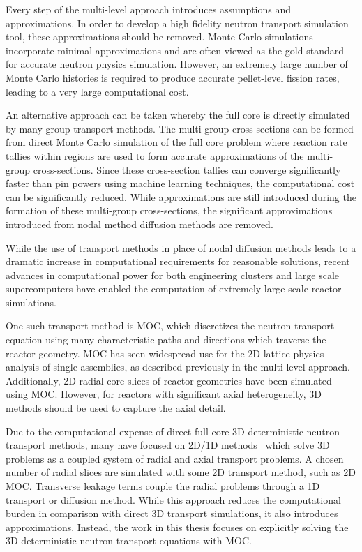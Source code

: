 Every step of the multi-level approach introduces assumptions and approximations. In order to develop a high fidelity neutron transport simulation tool, these approximations should be removed. Monte Carlo simulations incorporate minimal approximations and are often viewed as the gold standard for accurate neutron physics simulation. However, an extremely large number of Monte Carlo histories is required to produce accurate pellet-level fission rates, leading to a very large computational cost.

An alternative approach can be taken whereby the full core is directly simulated by many-group transport methods. The multi-group cross-sections can be formed from direct Monte Carlo simulation of the full core problem where reaction rate tallies within regions are used to form accurate approximations of the multi-group cross-sections. Since these cross-section tallies can converge significantly faster than pin powers using machine learning techniques, the computational cost can be significantly reduced. While approximations are still introduced during the formation of these multi-group cross-sections, the significant approximations introduced from nodal method diffusion methods are removed.

While the use of transport methods in place of nodal diffusion methods leads to a dramatic increase in computational requirements for reasonable solutions, recent advances in computational power for both engineering clusters and large scale supercomputers have enabled the computation of extremely large scale reactor simulations. 

One such transport method is \ac{MOC}, which discretizes the neutron transport equation using many characteristic paths and directions which traverse the reactor geometry. \ac{MOC} has seen widespread use for the 2D lattice physics analysis of single assemblies, as described previously in the multi-level approach. Additionally, 2D radial core slices of reactor geometries have been simulated using \ac{MOC}. However, for reactors with significant axial heterogeneity, 3D methods should be used to capture the axial detail. 

Due to the computational expense of direct full core 3D deterministic neutron transport methods, many have focused on 2D/1D methods~\cite{2d1d,liu2d1d, tang2d1d, collins2d1d, jarrett2d1d, wenbin2d1d} which solve 3D problems as a coupled system of radial and axial transport problems. A chosen number of radial slices are simulated with some 2D transport method, such as 2D \ac{MOC}. Transverse leakage terms couple the radial problems through a 1D transport or diffusion method. While this approach reduces the computational burden in comparison with direct 3D transport simulations, it also introduces approximations. Instead, the work in this thesis focuses on explicitly solving the 3D deterministic neutron transport equations with \ac{MOC}.

